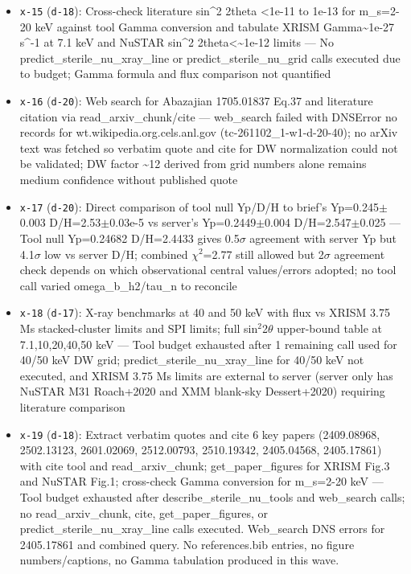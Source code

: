 \documentclass[11pt,a4paper]{article}
\begin{document}
\begin{itemize}
  \item \texttt{x-15} (\texttt{d-18}): Cross-check literature sin\textasciicircum{}2 2theta \textless{}1e-11 to 1e-13 for m\_s=2-20 keV against tool Gamma conversion and tabulate XRISM Gamma\textasciitilde{}1e-27 s\textasciicircum{}-1 at 7.1 keV and NuSTAR sin\textasciicircum{}2 2theta\textless{}\textasciitilde{}1e-12 limits --- No predict\_sterile\_nu\_xray\_line or predict\_sterile\_nu\_grid calls executed due to budget; Gamma formula and flux comparison not quantified
  \item \texttt{x-16} (\texttt{d-20}): Web search for Abazajian 1705.01837 Eq.37 and literature citation via read\_arxiv\_chunk/cite --- web\_search failed with DNSError no records for wt.wikipedia.org.cels.anl.gov (tc-261102\_1-w1-d-20-40); no arXiv text was fetched so verbatim quote and cite for DW normalization could not be validated; DW factor \textasciitilde{}12 derived from grid numbers alone remains medium confidence without published quote
  \item \texttt{x-17} (\texttt{d-20}): Direct comparison of tool null Yp/D/H to brief's Yp=0.245$\pm$0.003 D/H=2.53$\pm$0.03e-5 vs server's Yp=0.2449$\pm$0.004 D/H=2.547$\pm$0.025 --- Tool null Yp=0.24682 D/H=2.4433 gives 0.5$\sigma$ agreement with server Yp but 4.1$\sigma$ low vs server D/H; combined $\chi$$^2$=2.77 still allowed but 2$\sigma$ agreement check depends on which observational central values/errors adopted; no tool call varied omega\_b\_h2/tau\_n to reconcile
  \item \texttt{x-18} (\texttt{d-17}): X-ray benchmarks at 40 and 50 keV with flux vs XRISM 3.75 Ms stacked-cluster limits and SPI limits; full sin$^2$2$\theta$ upper-bound table at 7.1,10,20,40,50 keV --- Tool budget exhausted after 1 remaining call used for 40/50 keV DW grid; predict\_sterile\_nu\_xray\_line for 40/50 keV not executed, and XRISM 3.75 Ms limits are external to server (server only has NuSTAR M31 Roach+2020 and XMM blank-sky Dessert+2020) requiring literature comparison
  \item \texttt{x-19} (\texttt{d-18}): Extract verbatim quotes and cite 6 key papers (2409.08968, 2502.13123, 2601.02069, 2512.00793, 2510.19342, 2405.04568, 2405.17861) with cite tool and read\_arxiv\_chunk; get\_paper\_figures for XRISM Fig.3 and NuSTAR Fig.1; cross-check Gamma conversion for m\_s=2-20 keV --- Tool budget exhausted after describe\_sterile\_nu\_tools and web\_search calls; no read\_arxiv\_chunk, cite, get\_paper\_figures, or predict\_sterile\_nu\_xray\_line calls executed. Web\_search DNS errors for 2405.17861 and combined query. No references.bib entries, no figure numbers/captions, no Gamma tabulation produced in this wave.
$$
\end{itemize}
\end{document}
